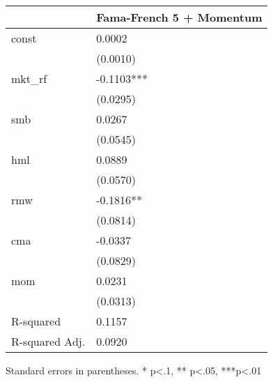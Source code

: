 \begin{table}
\caption{}
\label{}
\begin{center}
\begin{tabular}{ll}
\hline
               & Fama-French 5 + Momentum  \\
\hline
const          & 0.0002                    \\
               & (0.0010)                  \\
mkt\_rf        & -0.1103***                \\
               & (0.0295)                  \\
smb            & 0.0267                    \\
               & (0.0545)                  \\
hml            & 0.0889                    \\
               & (0.0570)                  \\
rmw            & -0.1816**                 \\
               & (0.0814)                  \\
cma            & -0.0337                   \\
               & (0.0829)                  \\
mom            & 0.0231                    \\
               & (0.0313)                  \\
R-squared      & 0.1157                    \\
R-squared Adj. & 0.0920                    \\
\hline
\end{tabular}
\end{center}
\end{table}
\bigskip
Standard errors in parentheses. \newline 
* p<.1, ** p<.05, ***p<.01